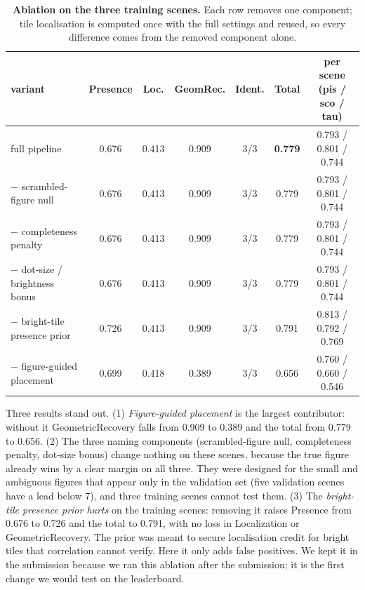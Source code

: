 \documentclass[a4paper,11pt]{article}
\begin{document}
\begin{table}[h]
\centering\small
\begin{tabular}{lcccccc}
\toprule
variant & Presence & Loc. & GeomRec. & Ident. & \textbf{Total} & per scene (pis / sco / tau) \\
\midrule
full pipeline                         & 0.676 & 0.413 & 0.909 & 3/3 & \textbf{0.779} & 0.793 / 0.801 / 0.744 \\
$-$ scrambled-figure null             & 0.676 & 0.413 & 0.909 & 3/3 & 0.779 & 0.793 / 0.801 / 0.744 \\
$-$ completeness penalty              & 0.676 & 0.413 & 0.909 & 3/3 & 0.779 & 0.793 / 0.801 / 0.744 \\
$-$ dot-size / brightness bonus       & 0.676 & 0.413 & 0.909 & 3/3 & 0.779 & 0.793 / 0.801 / 0.744 \\
$-$ bright-tile presence prior        & 0.726 & 0.413 & 0.909 & 3/3 & 0.791 & 0.813 / 0.792 / 0.769 \\
$-$ figure-guided placement           & 0.699 & 0.418 & 0.389 & 3/3 & 0.656 & 0.760 / 0.660 / 0.546 \\
\bottomrule
\end{tabular}
\caption{\textbf{Ablation on the three training scenes.} Each row removes one component; tile localisation is computed
once with the full settings and reused, so every difference comes from the removed component alone.}
\label{tab:ablation}
\end{table}

Three results stand out. (1) \emph{Figure-guided placement} is the largest contributor: without it GeometricRecovery
falls from 0.909 to 0.389 and the total from 0.779 to 0.656. (2) The three naming components (scrambled-figure null,
completeness penalty, dot-size bonus) change nothing on these scenes, because the true figure already wins by a clear
margin on all three. They were designed for the small and ambiguous figures that appear only in the validation set
(five validation scenes have a lead below 7), and three training scenes cannot test them. (3) The \emph{bright-tile
presence prior hurts} on the training scenes: removing it raises Presence from 0.676 to 0.726 and the total to 0.791,
with no loss in Localization or GeometricRecovery. The prior was meant to secure localisation credit for bright tiles
that correlation cannot verify. Here it only adds false positives. We kept it in the submission because we ran this
ablation after the submission; it is the first change we would test on the leaderboard.
\end{document}
